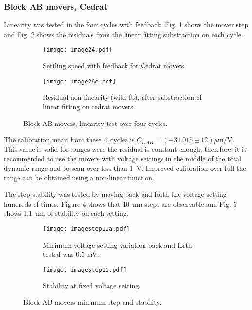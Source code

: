 \subsubsection{Block AB movers, Cedrat}
Linearity was tested in the four cycles with feedback. Fig. \ref{f:Cedratmsteps} shows the mover step and Fig. \ref{f:Cedratlinres} shows the residuals from the linear fitting substraction on each cycle.\par
\begin{figure}[!htb]
 \centering\hspace*{-0.6cm}
\begin{subfigure}{0.4\textwidth}
 \texttt{[image: image24.pdf]}\caption{Settling speed with feedback for Cedrat movers.}\label{f:Cedratmsteps}
\end{subfigure}\hspace*{1.5cm}
\begin{subfigure}{0.4\textwidth}
 \texttt{[image: image26e.pdf]}\caption{Residual non-linearity (with fb), after substraction of linear fitting on cedrat movers.}\label{f:Cedratlinres}
\end{subfigure}\caption{Block AB movers, linearity test over four cycles.}\label{f:Cedratfeedback}
\end{figure}
The calibration mean from these 4~cycles is $C_{mAB} = (-31.015\pm12)\mu$m/V. This value is valid for ranges were the residual is constant enough, therefore, it is recommended to use the movers with voltage settings in the middle of the total dynamic range and to scan over less than 1~V. Improved calibration over full the range can be obtained using a non-linear function.\par
The step stability was tested by moving back and forth the voltage setting hundreds of times. Figure \ref{f:Cedratstepstab} shows that 10~nm steps are observable and Fig. \ref{f:Cedratstab} shows 1.1~nm of stability on each setting.\par
\begin{figure}[!htb]
 \centering\hspace*{-0.6cm}
\begin{subfigure}{0.4\textwidth}
\texttt{[image: imagestep12a.pdf]}\caption{Minimum voltage setting variation back and forth tested was 0.5 mV.}\label{f:Cedratstepstab}
\end{subfigure}\hspace*{1.5cm}
\begin{subfigure}{0.4\textwidth}
 \texttt{[image: imagestep12.pdf]}\caption{Stability at fixed voltage setting.}\label{f:Cedratstab}
\end{subfigure}\caption{Block AB movers minimum step and stability.}\label{f:Cedratstability}
\end{figure}
